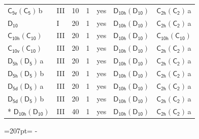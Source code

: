 \documentclass[10pt,a4paper]{article}
\newcommand{\needspace}[1]{\par\penalty-100\begingroup\dimen0=#1\relax\dimen2=\pagegoal
  \advance\dimen2-\pagetotal\ifdim\dimen0>\dimen2\relax\ifdim\dimen2>0pt\vfil\break\fi\fi
  \endgroup}
\numberwithin{equation}{section}
\newcommand{\grp}[1]{\mathsf{#1}}
\newcommand{\clsletter}[1]{\,{\scriptsize\color{black!55}#1}}
\begin{document}
{\begin{longtable}{@{}llrrlll@{}}
\href{C5v-C5.pdf}{$\grp{C_{5v}}(\grp{C_{5}})$}\clsletter{b} & III & 10 & 1 & yes & \href{D10h-D10.pdf}{$\grp{D_{10h}}(\grp{D_{10}})$} & \href{C2h-C2.pdf}{$\grp{C_{2h}}(\grp{C_{2}})$}\clsletter{a}\\
\href{../../../rotation/data/pdf/D10.pdf}{$\grp{D_{10}}$} & I & 20 & 1 & yes & \href{D10h-D10.pdf}{$\grp{D_{10h}}(\grp{D_{10}})$} & \href{C2h-C2.pdf}{$\grp{C_{2h}}(\grp{C_{2}})$}\clsletter{a}\\
\href{C10h-C10.pdf}{$\grp{C_{10h}}(\grp{C_{10}})$} & III & 20 & 1 & yes & \href{D10h-D10.pdf}{$\grp{D_{10h}}(\grp{D_{10}})$} & \href{C10h-C10.pdf}{$\grp{C_{10h}}(\grp{C_{10}})$}\\
\href{C10v-C10.pdf}{$\grp{C_{10v}}(\grp{C_{10}})$} & III & 20 & 1 & yes & \href{D10h-D10.pdf}{$\grp{D_{10h}}(\grp{D_{10}})$} & \href{C2h-C2.pdf}{$\grp{C_{2h}}(\grp{C_{2}})$}\clsletter{a}\\
\href{D5h-D5.pdf}{$\grp{D_{5h}}(\grp{D_{5}})$}\clsletter{a} & III & 20 & 1 & yes & \href{D10h-D10.pdf}{$\grp{D_{10h}}(\grp{D_{10}})$} & \href{C2h-C2.pdf}{$\grp{C_{2h}}(\grp{C_{2}})$}\clsletter{a}\\
\href{D5h-D5.pdf}{$\grp{D_{5h}}(\grp{D_{5}})$}\clsletter{b} & III & 20 & 1 & yes & \href{D10h-D10.pdf}{$\grp{D_{10h}}(\grp{D_{10}})$} & \href{C2h-C2.pdf}{$\grp{C_{2h}}(\grp{C_{2}})$}\clsletter{a}\\
\href{D5d-D5.pdf}{$\grp{D_{5d}}(\grp{D_{5}})$}\clsletter{a} & III & 20 & 1 & yes & \href{D10h-D10.pdf}{$\grp{D_{10h}}(\grp{D_{10}})$} & \href{C2h-C2.pdf}{$\grp{C_{2h}}(\grp{C_{2}})$}\clsletter{a}\\
\href{D5d-D5.pdf}{$\grp{D_{5d}}(\grp{D_{5}})$}\clsletter{b} & III & 20 & 1 & yes & \href{D10h-D10.pdf}{$\grp{D_{10h}}(\grp{D_{10}})$} & \href{C2h-C2.pdf}{$\grp{C_{2h}}(\grp{C_{2}})$}\clsletter{a}\\*
\href{D10h-D10.pdf}{$\grp{D_{10h}}(\grp{D_{10}})$} & III & 40 & 1 & yes & \href{D10h-D10.pdf}{$\grp{D_{10h}}(\grp{D_{10}})$} & \href{C2h-C2.pdf}{$\grp{C_{2h}}(\grp{C_{2}})$}\clsletter{a}\\
\bottomrule\end{longtable}}
\needspace{207pt}
\end{document}
